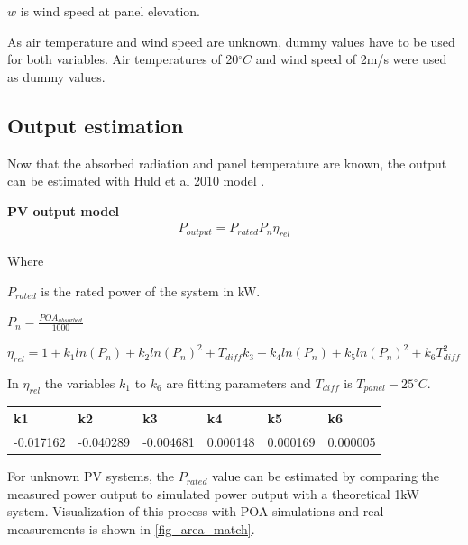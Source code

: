 $w$ is wind speed at panel elevation.


\vspace{6mm}

\noindent As air temperature and wind speed are unknown, dummy values have to be used for both variables. Air temperatures of 20$^\circ C$ and wind speed of 2m/s were used as dummy values.

\newpage
\subsection{Output estimation}
Now that the absorbed radiation and panel temperature are known, the output can be estimated with Huld et al 2010 model \cite{huld2010}.

\noindent\textbf{PV output model}
\begin{equation}
\begin{split}
\label{pv_output_model}
P_{output} = P_{rated}  P_n  \eta_{rel}
\end{split}
\end{equation}

\noindent Where 

$P_{rated}$ is the rated power of the system in kW.

$P_n = \frac{POA_{absorbed}}{1000}$


$\eta_{rel}= 1+k_1 ln(P_n) + k_2 ln(P_n)^2 + T_{diff}k_3 + k_4 ln(P_n) + k_5 ln(P_n)^2 + k_6 T_{diff}^2$

In $\eta_{rel}$ the variables $k_1$ to $k_6$ are fitting parameters and $T_{diff}$ is $T_{panel}-25^\circ C$.

\begin{table}[h]
\begin{tabular}{l|l|l|l|l|l}
k1        & k2        & k3        & k4       & k5       & k6       \\ \hline
-0.017162 & -0.040289 & -0.004681 & 0.000148 & 0.000169 & 0.000005
\end{tabular}
\end{table}

\noindent %
For unknown PV systems, the $P_{rated}$ value can be estimated by comparing the measured power output to simulated power output with a theoretical 1kW system. Visualization of this process with POA simulations and real measurements is shown in \ref{fig_area_match}.


